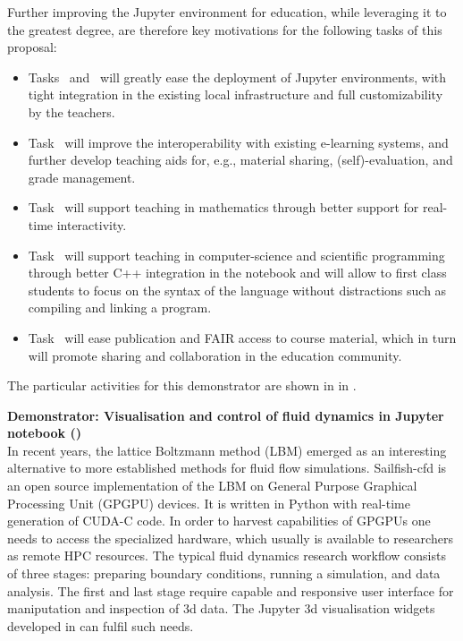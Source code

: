   Further improving the Jupyter environment for education, while
  leveraging it to the greatest degree, are therefore key motivations
  for the following tasks of this proposal:
  \begin{itemize}
  \item Tasks~
    and~ will greatly ease the
    deployment of Jupyter environments, with tight integration in the
    existing local infrastructure and full customizability by the
    teachers.
  \item Task~ will improve the
    interoperability with existing e-learning systems, and further
    develop teaching aids for, e.g., material sharing,
    (self)-evaluation, and grade management.
  \item Task~ will support teaching
    in mathematics through better support for real-time interactivity.
  \item Task~ will support teaching
    in computer-science and scientific programming through
    better C++ integration in the notebook and will allow to first class students to focus on the
    syntax of the language without distractions such as compiling and
    linking a program.
  \item Task~ will ease publication and FAIR
    access to course material, which in turn will promote sharing
    and collaboration in the education community.
  \end{itemize}

  The particular activities for this demonstrator are shown in
   in .

\medskip
\noindent\textbf{Demonstrator: Visualisation and control of fluid dynamics in
  Jupyter notebook ()}\label{sec:concept-demonstrator-gpu}\\
In recent years, the lattice Boltzmann method (LBM) emerged as an
interesting alternative to more established methods for fluid flow
simulations. Sailfish-cfd \cite{januszewski2014sailfish} is an open
source implementation of the LBM on General Purpose Graphical Processing
Unit (GPGPU) devices. It is written in Python with real-time
generation of CUDA-C code.  In order to harvest capabilities of GPGPUs
one needs to access the specialized hardware, which usually is
available to researchers as remote HPC resources.  The typical fluid
dynamics research workflow consists of three stages: preparing
boundary conditions, running a simulation, and data analysis. The
first and last stage require capable and responsive user interface for
maniputation and inspection of 3d data.  The Jupyter 3d visualisation
widgets developed in  can fulfil
such needs.

